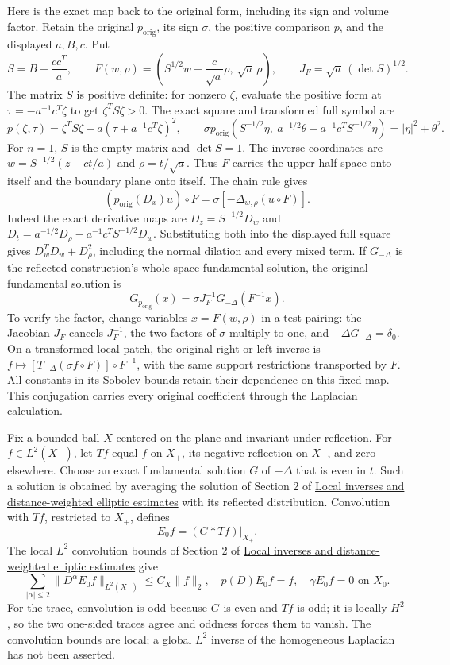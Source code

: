 \documentclass[
  11pt,
]{article}
\begin{document}
Here is the exact map back to the original form, including its sign and
volume factor. Retain the original \(p_{\mathrm{orig}}\), its sign
\(\sigma\), the positive comparison \(p\), and the displayed \(a,B,c\).
Put \[
S=B-\frac{cc^T}{a},\qquad
F(w,\rho)=\left(S^{1/2}w+\frac{c}{\sqrt a}\rho,\ \sqrt a\,\rho\right),
\qquad
J_F=\sqrt a\,(\det S)^{1/2}.
\] The matrix \(S\) is positive definite: for nonzero \(\zeta\),
evaluate the positive form at \(\tau=-a^{-1}c^T\zeta\) to get
\(\zeta^TS\zeta>0\). The exact square and transformed full symbol are \[
p(\zeta,\tau)=\zeta^TS\zeta+a(\tau+a^{-1}c^T\zeta)^2,\qquad
\sigma p_{\mathrm{orig}}\!\left(S^{-1/2}\eta,\ a^{-1/2}\theta-a^{-1}c^TS^{-1/2}\eta\right)
=|\eta|^2+\theta^2.
\] For \(n=1\), \(S\) is the empty matrix and \(\det S=1\). The inverse
coordinates are \(w=S^{-1/2}(z-ct/a)\) and \(\rho=t/\sqrt a\). Thus
\(F\) carries the upper half-space onto itself and the boundary plane
onto itself. The chain rule gives \[
(p_{\mathrm{orig}}(D_x)u)\circ F
=\sigma\left[-\Delta_{w,\rho}(u\circ F)\right].
\] Indeed the exact derivative maps are \(D_z=S^{-1/2}D_w\) and
\(D_t=a^{-1/2}D_\rho-a^{-1}c^TS^{-1/2}D_w\). Substituting both into the
displayed full square gives \(D_w^TD_w+D_\rho^2\), including the normal
dilation and every mixed term. If \(G_{-\Delta}\) is the reflected
construction's whole-space fundamental solution, the original
fundamental solution is \[
G_{p_{\mathrm{orig}}}(x)
=\sigma J_F^{-1}G_{-\Delta}(F^{-1}x).
\] To verify the factor, change variables \(x=F(w,\rho)\) in a test
pairing: the Jacobian \(J_F\) cancels \(J_F^{-1}\), the two factors of
\(\sigma\) multiply to one, and \(-\Delta G_{-\Delta}=\delta_0\). On a
transformed local patch, the original right or left inverse is
\(f\mapsto [T_{-\Delta}(\sigma f\circ F)]\circ F^{-1}\), with the same
support restrictions transported by \(F\). All constants in its Sobolev
bounds retain their dependence on this fixed map. This conjugation
carries every original coefficient through the Laplacian calculation.

Fix a bounded ball \(X\) centered on the plane and invariant under
reflection. For \(f\in L^2(X_+)\), let \(Tf\) equal \(f\) on \(X_+\),
its negative reflection on \(X_-\), and zero elsewhere. Choose an exact
fundamental solution \(G\) of \(-\Delta\) that is even in \(t\). Such a
solution is obtained by averaging the solution of Section 2 of
\href{local-elliptic-coefficients.pdf}{Local inverses and
distance-weighted elliptic estimates} with its reflected distribution.
Convolution with \(Tf\), restricted to \(X_+\), defines \[
 E_0f=(G*Tf)|_{X_+}. \tag{B13}
\] The local \(L^2\) convolution bounds of Section 2 of
\href{local-elliptic-coefficients.pdf}{Local inverses and
distance-weighted elliptic estimates} give \[
 \sum_{|\alpha|\leq2}\|D^\alpha E_0f\|_{L^2(X_+)}\leq C_X\|f\|_2,
 \quad p(D)E_0f=f,\quad\gamma E_0f=0\text{ on }X_0. \tag{B14}
\] For the trace, convolution is odd because \(G\) is even and \(Tf\) is
odd; it is locally \(H^2\), so the two one-sided traces agree and
oddness forces them to vanish. The convolution bounds are local; a
global \(L^2\) inverse of the homogeneous Laplacian has not been
asserted.
\end{document}
